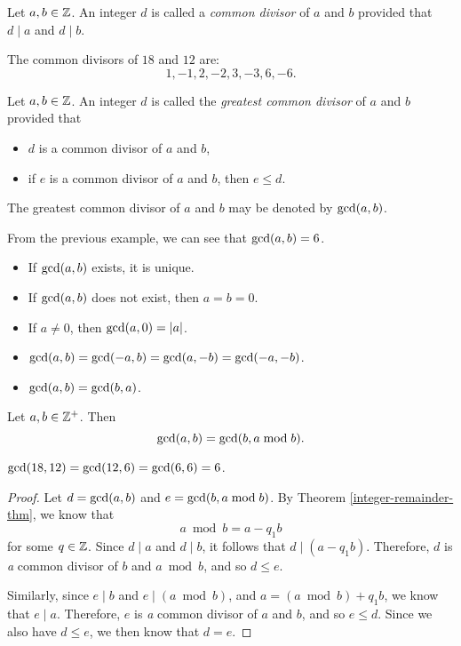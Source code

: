 \begin{defn}
    Let $a, b \in \mathbb{Z}$. An integer $d$ is called a \emph{common divisor} of $a$ and $b$ provided that $d \mid a$ and $d \mid b$.
\end{defn}

\begin{exmp}
    The common divisors of $18$ and $12$ are: \[1, -1, 2, -2, 3, -3, 6, -6.\]
\end{exmp}

\begin{defn}
    Let $a, b \in \mathbb{Z}$. An integer $d$ is called the \emph{greatest common divisor} of $a$ and $b$ provided that
    \begin{itemize}
        \item $d$ is a common divisor of $a$ and $b$,
        \item if $e$ is a common divisor of $a$ and $b$, then $e \leq d$.
    \end{itemize}
    The greatest common divisor of $a$ and $b$ may be denoted by $\operatorname{gcd}(a, b)$.
\end{defn}

\begin{exmp}
    From the previous example, we can see that $\operatorname{gcd}(a, b) = 6$.
\end{exmp}

\begin{rmk}\proofbreak
    \begin{itemize}
        \item If $\operatorname{gcd}(a, b)$ exists, it is unique.
        \item If $\operatorname{gcd}(a, b)$ does not exist, then $a = b = 0$.
        \item If $a \neq 0$, then $\operatorname{gcd}(a, 0) = |a|$.
        \item $\operatorname{gcd}(a, b) = \operatorname{gcd}(-a, b) = \operatorname{gcd}(a, -b) = \operatorname{gcd}(-a, -b)$.
        \item $\operatorname{gcd}(a, b) = \operatorname{gcd}(b, a)$.
    \end{itemize}
\end{rmk}

\begin{prop}\label{euclidean-division-property}
    Let $a, b \in \mathbb{Z}^+$. Then \[\operatorname{gcd}(a, b) = \operatorname{gcd}(b, a \bmod b).\]
\end{prop}

\begin{exmp}
    $\operatorname{gcd}(18, 12) = \operatorname{gcd}(12, 6) = \operatorname{gcd}(6, 6) = 6$.
\end{exmp}

\begin{proof}
    Let $d = \operatorname{gcd}(a, b)$ and $e = \operatorname{gcd}(b, a \bmod b)$. By Theorem \ref{integer-remainder-thm}, we know that \[a \bmod b = a - q_1b\] for some $q \in \mathbb{Z}$. Since $d \mid a$ and $d \mid b$, it follows that $d \mid (a - q_1b)$. Therefore, $d$ is \emph{a} common divisor of $b$ and $a \bmod b$, and so $d \leq e$.

    Similarly, since $e \mid b$ and $e \mid (a \bmod b)$, and $a = (a \bmod b) + q_1b$, we know that $e \mid a$. Therefore, $e$ is \emph{a} common divisor of $a$ and $b$, and so $e \leq d$. Since we also have $d \leq e$, we then know that $d = e$.
\end{proof}


